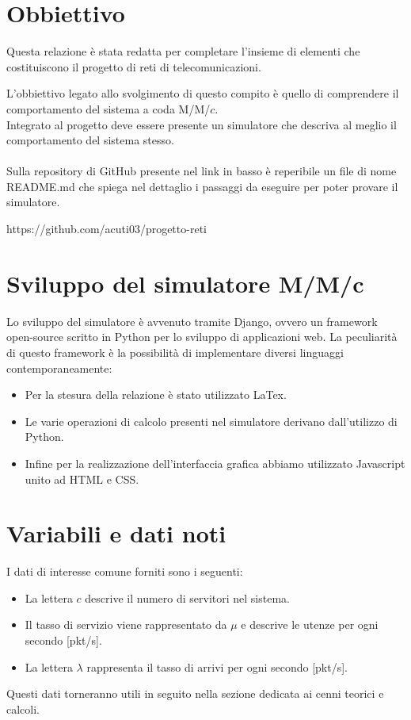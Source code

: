 \documentclass[12pt,a4paper]{article}
\begin{document}
\newpage
\section{Obbiettivo}

    Questa relazione è stata redatta per completare l'insieme di elementi che costituiscono il progetto di reti di telecomunicazioni.
    
    L'obbiettivo legato allo svolgimento di questo compito è quello di comprendere il comportamento del sistema a coda M/M/$c$. \\ 
    Integrato al progetto deve essere presente un simulatore che descriva al meglio il comportamento del sistema stesso. \\ \\
    Sulla repository di GitHub presente nel link in basso è reperibile un file di nome README.md che spiega nel dettaglio i passaggi da eseguire per poter provare il simulatore.
    \begin{center}
       \color{blue} https://github.com/acuti03/progetto-reti
    \end{center}
\section{Sviluppo del simulatore M/M/c}
    Lo sviluppo del simulatore è avvenuto tramite Django, ovvero un framework open-source scritto in Python per lo sviluppo di applicazioni web. La peculiarità di questo framework è la possibilità di implementare diversi linguaggi contemporaneamente: 
    \begin{itemize}
        \item  Per la stesura della relazione è stato utilizzato LaTex.
        \item  Le varie operazioni di calcolo presenti nel simulatore derivano dall'utilizzo di Python. 
        \item  Infine per la realizzazione dell'interfaccia grafica abbiamo utilizzato Javascript unito ad HTML e CSS.
    \end{itemize}

\section{Variabili e dati noti}

I dati di interesse comune forniti sono i seguenti:
    
    \begin{itemize}
    \item La lettera $c$ descrive il numero di servitori nel sistema.
    
    \item Il tasso di servizio viene rappresentato da $\mu$ e descrive le utenze per ogni secondo [pkt/s]. 
    
    \item La lettera $\lambda$ rappresenta il tasso di arrivi per ogni secondo [pkt/s].
    \end{itemize}
    Questi dati torneranno utili in seguito nella sezione dedicata ai cenni teorici e calcoli. \\
\newpage
\end{document}

